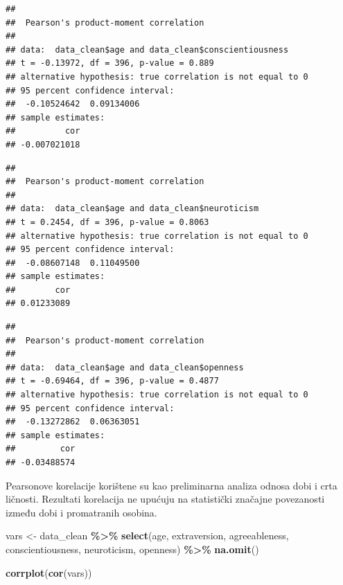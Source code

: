 \documentclass[
]{article}
\newenvironment{Shaded}{\begin{snugshade}}{\end{snugshade}}
\newcommand{\FunctionTok}[1]{\textcolor[rgb]{0.13,0.29,0.53}{\textbf{#1}}}
\newcommand{\NormalTok}[1]{#1}
\newcommand{\OtherTok}[1]{\textcolor[rgb]{0.56,0.35,0.01}{#1}}
\newcommand{\SpecialCharTok}[1]{\textcolor[rgb]{0.81,0.36,0.00}{\textbf{#1}}}
\begin{document}
\begin{verbatim}
## 
##  Pearson's product-moment correlation
## 
## data:  data_clean$age and data_clean$conscientiousness
## t = -0.13972, df = 396, p-value = 0.889
## alternative hypothesis: true correlation is not equal to 0
## 95 percent confidence interval:
##  -0.10524642  0.09134006
## sample estimates:
##          cor 
## -0.007021018
\end{verbatim}

\begin{Shaded}
\end{Shaded}

\begin{verbatim}
## 
##  Pearson's product-moment correlation
## 
## data:  data_clean$age and data_clean$neuroticism
## t = 0.2454, df = 396, p-value = 0.8063
## alternative hypothesis: true correlation is not equal to 0
## 95 percent confidence interval:
##  -0.08607148  0.11049500
## sample estimates:
##        cor 
## 0.01233089
\end{verbatim}

\begin{Shaded}
\end{Shaded}

\begin{verbatim}
## 
##  Pearson's product-moment correlation
## 
## data:  data_clean$age and data_clean$openness
## t = -0.69464, df = 396, p-value = 0.4877
## alternative hypothesis: true correlation is not equal to 0
## 95 percent confidence interval:
##  -0.13272862  0.06363051
## sample estimates:
##         cor 
## -0.03488574
\end{verbatim}

Pearsonove korelacije korištene su kao preliminarna analiza odnosa dobi
i crta ličnosti. Rezultati korelacija ne upućuju na statistički značajne
povezanosti između dobi i promatranih osobina.

\begin{Shaded}
\begin{Highlighting}[]
\NormalTok{vars }\OtherTok{\textless{}{-}}\NormalTok{ data\_clean }\SpecialCharTok{\%\textgreater{}\%}
  \FunctionTok{select}\NormalTok{(age, extraversion, agreeableness,}
\NormalTok{         conscientiousness, neuroticism, openness) }\SpecialCharTok{\%\textgreater{}\%}
  \FunctionTok{na.omit}\NormalTok{()}

\FunctionTok{corrplot}\NormalTok{(}\FunctionTok{cor}\NormalTok{(vars))}
\end{Highlighting}
\end{Shaded}
\end{document}
